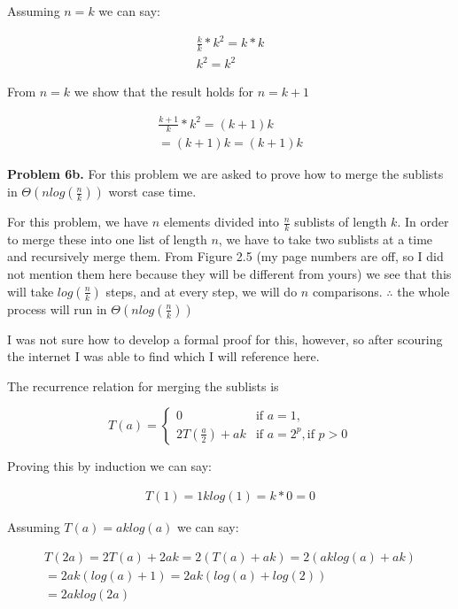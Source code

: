 \documentclass{article}
\begin{document}
Assuming $n=k$ we can say:

\begin{gather}
    \frac{k}{k}*k^2=k*k \\
    k^2 = k^2
\end{gather}

From $n = k$ we show that the result holds for $n=k+1$

\begin{gather}
    \frac{k+1}{k}*k^2=(k+1)k \\
    = (k+1)k = (k+1)k
\end{gather}

\hfill

\textbf{Problem 6b.} For this problem we are asked to prove how to merge the sublists in $\Theta(nlog(\frac{n}{k}))$ worst case time.

For this problem, we have $n$ elements divided into $\frac{n}{k}$ sublists of length $k$. In order to merge these into one list of length $n$, we have to take two sublists at a time and recursively merge them. From Figure 2.5 (my page numbers are off, so I did not mention them here because they will be different from yours) \cite{CLRS} we see that this will take $log(\frac{n}{k})$ steps, and at every step, we will do $n$ comparisons. $\therefore$ the whole process will run in $\Theta(nlog(\frac{n}{k}))$

I was not sure how to develop a formal proof for this, however, so after scouring the internet I was able to find \cite{website:4} which I will reference here.

The recurrence relation for merging the sublists is 

\begin{equation}
    T(a) = {
    \begin{cases}
        0 & \text{if } a = 1, \\
        2T(\frac{a}{2}) + ak & \text{if } a = 2^p, \text{if } p > 0
    \end{cases}
    } 
\end{equation}


Proving this by induction we can say:

\begin{gather}
    T(1) = 1klog(1) = k * 0 = 0
\end{gather}

Assuming $T(a)=aklog(a)$ we can say:

\begin{gather}
    T(2a) = 2T(a) + 2ak = 2(T(a) + ak) = 2(aklog(a) + ak) \\
    = 2ak(log(a) + 1) = 2ak(log(a) + log(2)) \\
    = 2aklog(2a)
\end{gather}
\end{document}
